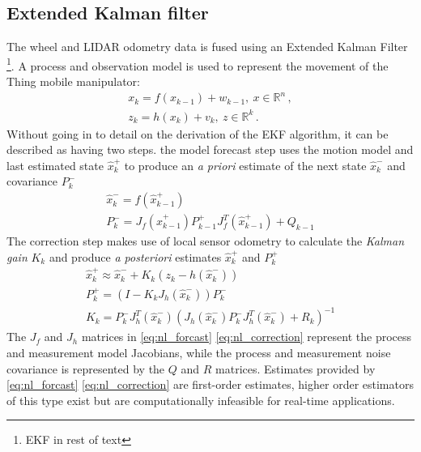 \documentclass[times, utf8, diplomski, english]{fer}
\begin{document}
\subsection{Extended Kalman filter}
The wheel and LIDAR odometry data is fused using an Extended Kalman Filter \footnote{EKF in rest of text}\citep{MooreStouchKeneralizedEkf2014}.
A process and observation model is used to represent the movement of the Thing mobile manipulator:
\begin{subequations}\label{state_space_nl2}
\begin{gather}
x_k = f\left(x_{k-1}\right) + w_{k-1} , \ x \in \mathbb{R}^n\, , \\
z_k = h\left(x_k\right) + v_k, \ z \in \mathbb{R}^k\, .
\end{gather}
\end{subequations}
Without going in to detail on the derivation of the EKF algorithm, it can be described as having two steps.\:
the model forecast step uses the motion model and last estimated state $\hat{x}_k^+$ to produce an \textit{a priori} estimate of the next state $\hat{x}_k^-$ and covariance $P_k^-$
\begin{subequations}\label{eq:nl_forcast}
\begin{gather}
\hat{x}_k^- = f\left(\hat{x}_{k-1}^+\right) \\
P_k^- = J_f\left(\hat{x}_{k-1}^+\right)P_{k-1}^+J_f^T\left(\hat{x}_{k-1}^+\right) + Q_{k-1}
\end{gather}
\end{subequations}
The correction step makes use of local sensor odometry to calculate the \textit{Kalman gain} $K_k$ and produce \textit{a posteriori} estimates $\hat{x}_k^+$ and $P_k^+$ 
\begin{subequations}\label{eq:nl_correction}
\begin{gather}
\hat{x}_k^+ \approx \hat{x}_k^- + K_k\left(z_k - h\left(\hat{x}_k^-\right)\right) \\
P_k^+ = \left(I - K_kJ_h\left(\hat{x}_k^-\right)\right)P_k^- \\
K_k = P_k^-J_h^T\left(\hat{x}_k^-\right)\left(J_h\left(\hat{x}_k^-\right)P_k^-J_h^T\left(\hat{x}_k^-\right) + R_k\right)^{-1} 
\end{gather}
\end{subequations}
The $J_f$ and $J_h$ matrices in \eqref{eq:nl_forcast} \eqref{eq:nl_correction} represent the process and measurement model Jacobians, while the process and measurement noise covariance is represented by the $Q$ and $R$ matrices.
Estimates provided by \eqref{eq:nl_forcast} \eqref{eq:nl_correction} are first-order estimates, higher order estimators of this type exist but are computationally infeasible for real-time applications.
\end{document}
